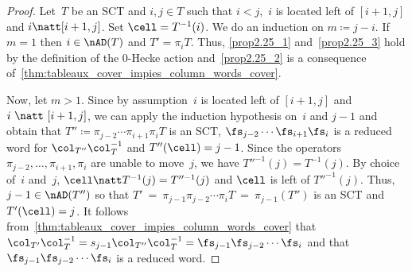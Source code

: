 \begin{proof}
	Let~$T$ be an SCT and $i,j\in T$ such that $i<j$,~$i$ is located left of $[i+1,j]$
	and $i \natt[i+1,j]$. Set $\cell = T^{-1}(i)$.
	We do an induction on $m\coloneqq j-i$. If $m=1$ then $i\in \nAD(T)$ and $T' = \pi_i T$. Thus, 	\eqref{prop2.25_1} and~\eqref{prop2.25_3} hold by the definition of the 0-Hecke action and~\eqref{prop2.25_2} is a consequence of~\cref{thm:tableaux_cover_impies_column_words_cover}.
	
	Now, let $m>1$. Since by assumption~$i$ is located left of $[i+1,j]$
	and $i~\natt~[i+1,j]$, we can apply the induction hypothesis on~$i$ and $j-1$ and obtain that $T''\coloneqq \pi_{j-2} \cdots \pi_{i+1}\pi_i T$ is an SCT, $\fs_{j-2} \cdots \fs_{i+1}\fs_i$ is a reduced word for $\col_{T''}\col_T^{-1}$ and $T''(\cell) = j-1$.
	Since the operators $\pi_{j-2}, \ldots, \pi_{i+1}, \pi_{i}$ are unable to move~$j$, we have $T''^{-1}(j) = T^{-1}(j).$
	By choice of~$i$ and~$j$, $\cell \natt T^{-1}(j) = T''^{-1}(j)$ and $\cell$ is left of $T''^{-1}(j)$.
	Thus, $j-1\in \nAD(T'')$ so that $T'~=~\pi_{j-1} \pi_{j-2}\cdots \pi_i T~=~\pi_{j-1}(T'')$ is an SCT and $T'(\cell) = j$.
	It follows from~\cref{thm:tableaux_cover_impies_column_words_cover} that $\col_{T'}\col_T^{-1}=s_{j-1}\col_{T''}\col^{-1}_{T}= \fs_{j-1}\fs_{j-2} \cdots \fs_i$ and that $\fs_{j-1}\fs_{j-2} \cdots \fs_i$ is a reduced word.
\end{proof}


